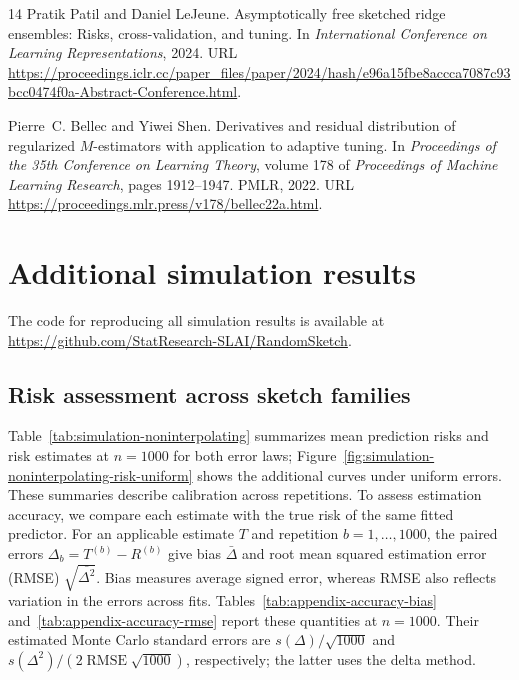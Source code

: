 \documentclass{article}
\theoremstyle{plain}
\theoremstyle{definition}
\theoremstyle{definition}
\begin{document}
\begin{thebibliography}{14}
Pratik Patil and Daniel LeJeune.
\newblock Asymptotically free sketched ridge ensembles: Risks, cross-validation, and tuning.
\newblock In \emph{International Conference on Learning Representations}, 2024.
\newblock URL \url{https://proceedings.iclr.cc/paper_files/paper/2024/hash/e96a15fbe8accca7087c93bcc0474f0a-Abstract-Conference.html}.

Pierre~C. Bellec and Yiwei Shen.
\newblock Derivatives and residual distribution of regularized {$M$}-estimators with application to adaptive tuning.
\newblock In \emph{Proceedings of the 35th Conference on Learning Theory}, volume 178 of \emph{Proceedings of Machine Learning Research}, pages 1912--1947. PMLR, 2022.
\newblock URL \url{https://proceedings.mlr.press/v178/bellec22a.html}.

\end{thebibliography}

\clearpage
\appendix

\section{Additional simulation results}
\label{app:additional-simulations}

The code for reproducing all simulation results is available at
\url{https://github.com/StatResearch-SLAI/RandomSketch}.

\subsection{Risk assessment across sketch families}
\label{sec:simulation-noninterpolating}
\label{app:simulation-accuracy}
Table~\ref{tab:simulation-noninterpolating} summarizes mean prediction
risks and risk estimates at $n=1000$ for both error laws;
Figure~\ref{fig:simulation-noninterpolating-risk-uniform} shows the
additional curves under uniform errors. These summaries describe
calibration across repetitions. To assess estimation accuracy, we compare
each estimate with the true risk of the same fitted predictor. For an
applicable estimate $T$ and
repetition $b=1,\ldots,1000$, the paired errors $\Delta_b=T^{(b)}-R^{(b)}$ give bias $\bar\Delta$ and root mean
squared estimation error (RMSE) $\sqrt{\overline{\Delta^2}}$.
Bias measures average signed error, whereas RMSE also reflects variation
in the errors across fits. Tables~\ref{tab:appendix-accuracy-bias}
and~\ref{tab:appendix-accuracy-rmse} report these quantities at $n=1000$.
Their estimated Monte Carlo standard errors are $s(\Delta)/\sqrt{1000}$ and
$s(\Delta^2)/(2\operatorname{RMSE}\sqrt{1000})$, respectively;
the latter uses the delta method.
\end{document}
